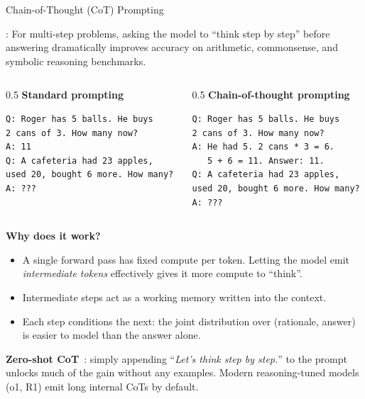 \begin{frame}[fragile]{Chain-of-Thought (CoT) Prompting}

  \cite{wei2022cot}: For multi-step problems, asking the model to ``think step by step''
  before answering dramatically improves accuracy on arithmetic, commonsense, and symbolic
  reasoning benchmarks.

  \vspace{0.3em}
  \begin{columns}
    \begin{column}{0.5\textwidth}
      {\scriptsize\textbf{Standard prompting}}
\begin{lstlisting}[basicstyle=\scriptsize\ttfamily, frame=single, backgroundcolor=\color{red!4}, rulecolor=\color{red!50!black}, keywordstyle={}, commentstyle={}, stringstyle={}, xleftmargin=0.3em, xrightmargin=0.3em, mathescape=false]
Q: Roger has 5 balls. He buys
2 cans of 3. How many now?
A: 11
Q: A cafeteria had 23 apples,
used 20, bought 6 more. How many?
A: ???
\end{lstlisting}
    \end{column}
    \begin{column}{0.5\textwidth}
      {\scriptsize\textbf{Chain-of-thought prompting}}
\begin{lstlisting}[basicstyle=\scriptsize\ttfamily, frame=single, backgroundcolor=\color{green!4}, rulecolor=\color{green!40!black}, keywordstyle={}, commentstyle={}, stringstyle={}, xleftmargin=0.3em, xrightmargin=0.3em, mathescape=false]
Q: Roger has 5 balls. He buys
2 cans of 3. How many now?
A: He had 5. 2 cans * 3 = 6.
   5 + 6 = 11. Answer: 11.
Q: A cafeteria had 23 apples,
used 20, bought 6 more. How many?
A: ???
\end{lstlisting}
    \end{column}
  \end{columns}

  \vspace{0.4em}
  \textbf{Why does it work?}
  \begin{itemize}[nosep]
    \item A single forward pass has fixed compute per token. Letting the model emit
      \emph{intermediate tokens} effectively gives it more compute to ``think''.
    \item Intermediate steps act as a working memory written into the context.
    \item Each step conditions the next: the joint distribution over (rationale, answer) is easier to model than the answer alone.
  \end{itemize}

  \vspace{0.3em}
  \textbf{Zero-shot CoT}~\cite{kojima2022zerocot}: simply appending ``\emph{Let's think step by step.}''
  to the prompt unlocks much of the gain without any examples.
  Modern reasoning-tuned models (o1, R1) emit long internal CoTs by default.
\end{frame}

